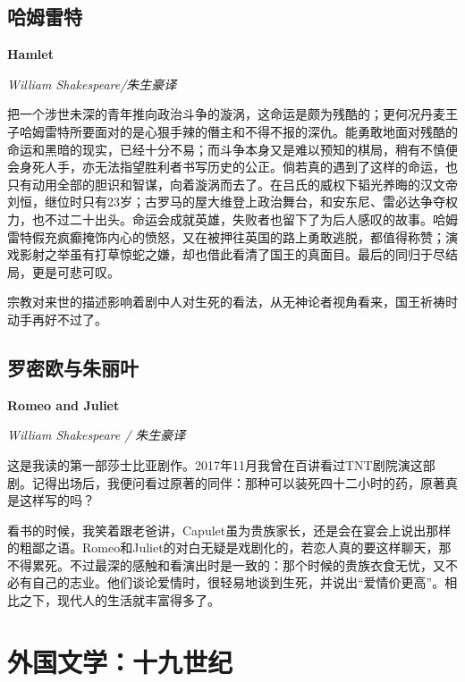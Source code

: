 \subsection*{哈姆雷特}
\par \textbf{Hamlet}
\par \emph{William Shakespeare/朱生豪译}
\par 把一个涉世未深的青年推向政治斗争的漩涡，这命运是颇为残酷的；更何况丹麦王子哈姆雷特所要面对的是心狠手辣的僭主和不得不报的深仇。能勇敢地面对残酷的命运和黑暗的现实，已经十分不易；而斗争本身又是难以预知的棋局，稍有不慎便会身死人手，亦无法指望胜利者书写历史的公正。倘若真的遇到了这样的命运，也只有动用全部的胆识和智谋，向着漩涡而去了。在吕氏的威权下韬光养晦的汉文帝刘恒，继位时只有23岁；古罗马的屋大维登上政治舞台，和安东尼、雷必达争夺权力，也不过二十出头。命运会成就英雄，失败者也留下了为后人感叹的故事。哈姆雷特假充疯癫掩饰内心的愤怒，又在被押往英国的路上勇敢逃脱，都值得称赞；演戏影射之举虽有打草惊蛇之嫌，却也借此看清了国王的真面目。最后的同归于尽结局，更是可悲可叹。
\par 宗教对来世的描述影响着剧中人对生死的看法，从无神论者视角看来，国王祈祷时动手再好不过了。
\par {}

\subsection*{罗密欧与朱丽叶}
\par \textbf{Romeo and Juliet}
\par \emph{William Shakespeare / 朱生豪译} 
\par 这是我读的第一部莎士比亚剧作。2017年11月我曾在百讲看过TNT剧院演这部剧。记得出场后，我便问看过原著的同伴：那种可以装死四十二小时的药，原著真是这样写的吗？
\par 看书的时候，我笑着跟老爸讲，Capulet虽为贵族家长，还是会在宴会上说出那样的粗鄙之语。Romeo和Juliet的对白无疑是戏剧化的，若恋人真的要这样聊天，那不得累死。不过最深的感触和看演出时是一致的：那个时候的贵族衣食无忧，又不必有自己的志业。他们谈论爱情时，很轻易地谈到生死，并说出“爱情价更高”。相比之下，现代人的生活就丰富得多了。
\par {}


\section{外国文学：十九世纪}

